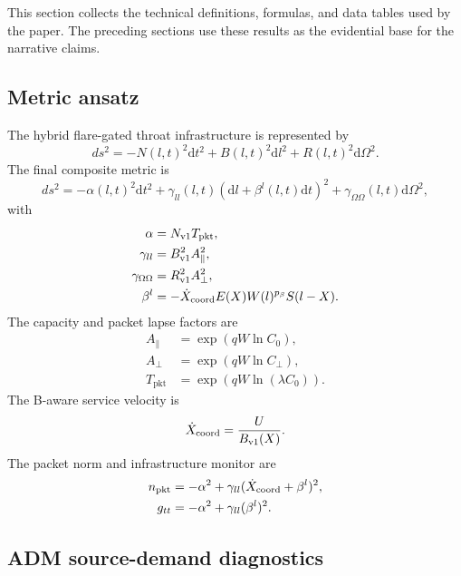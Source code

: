 \documentclass[11pt]{article}
\newcommand{\dd}{\mathrm{d}}
\newcommand{\pkt}{\mathrm{pkt}}
\begin{document}
This section collects the technical definitions, formulas, and data tables used by the paper. The preceding sections use these results as the evidential base for the narrative claims.

\subsection{Metric ansatz}

The hybrid flare-gated throat infrastructure is represented by
\begin{equation}
 ds^2=-N(l,t)^2\dd t^2+B(l,t)^2\dd l^2+R(l,t)^2\dd\Omega^2.
\end{equation}
The final composite metric is
\begin{equation}
 ds^2=-\alpha(l,t)^2\dd t^2+\gamma_{ll}(l,t)(\dd l+\beta^l(l,t)\dd t)^2+\gamma_{\Omega\Omega}(l,t)\dd\Omega^2,
\end{equation}
with
\begin{align}
\alpha&=N_{\rm v1}T_{\pkt},\\
\gamma_{ll}&=B_{\rm v1}^2A_\parallel^2,\\
\gamma_{\Omega\Omega}&=R_{\rm v1}^2A_\perp^2,\\
\beta^l&=-\dot{X}_{\rm coord}E(X)W(l)^{p_\beta}S(l-X).
\end{align}
The capacity and packet lapse factors are
\begin{align}
A_\parallel&=\exp(qW\ln C_0),\\
A_\perp&=\exp(qW\ln C_\perp),\\
T_{\pkt}&=\exp(qW\ln(\lambda C_0)).
\end{align}
The B-aware service velocity is
\begin{equation}
\dot{X}_{\rm coord}=\frac{U}{B_{\rm v1}(X)}.
\end{equation}
The packet norm and infrastructure monitor are
\begin{align}
n_{\pkt}&=-\alpha^2+\gamma_{ll}(\dot{X}_{\rm coord}+\beta^l)^2,\\
g_{tt}&=-\alpha^2+\gamma_{ll}(\beta^l)^2.
\end{align}

\subsection{ADM source-demand diagnostics}
\end{document}
